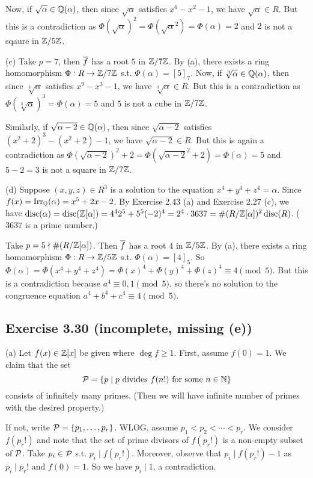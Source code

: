 \documentclass[../Marcus.tex]{subfiles}
\begin{document}
Now, if $\sqrt{\alpha}\in\mathbb{Q}(\alpha)$, then since $\sqrt{\alpha}$ satisfies $x^6-x^2-1$, we have $\sqrt{\alpha}\in R$. But this is a contradiction as $\Phi(\sqrt{\alpha})^2=\Phi(\sqrt{\alpha}^2)=\Phi(\alpha)=2$ and $2$ is not a sqaure in $\mathbb{Z}/5\mathbb{Z}$.

(c) Take $p=7$, then $\overline{f}$ has a root $5$ in $\mathbb{Z}/7\mathbb{Z}$. By (a), there exists a ring homomorphism $\Phi:R\to\mathbb{Z}/7\mathbb{Z}$ s.t. $\Phi(\alpha)=[5]_7$. Now, if $\sqrt[3]{\alpha}\in\mathbb{Q}(\alpha)$, then since $\sqrt[3]{\alpha}$ satisfies $x^9-x^3-1$, we have $\sqrt[3]{\alpha}\in R$. But this is a contradiction as $\Phi(\sqrt[3]{\alpha})^3=\Phi(\alpha)=5$ and $5$ is not a cube in $\mathbb{Z}/7\mathbb{Z}$.

Similarly, if $\sqrt{\alpha-2}\in\mathbb{Q}(\alpha)$, then since $\sqrt{\alpha-2}$ satisfies $(x^2+2)^3-(x^2+2)-1$, we have $\sqrt{\alpha-2}\in R$. But this is again a contradiction as $\Phi(\sqrt{\alpha-2})^2+2=\Phi(\sqrt{\alpha-2}^2+2)=\Phi(\alpha)=5$ and $5-2=3$ is not a square in $\mathbb{Z}/7\mathbb{Z}$.

(d) Suppose $(x,y,z)\in R^3$ is a solution to the equation $x^4+y^4+z^4=\alpha$. Since $f(x)=\operatorname{Irr}_{\mathbb{Q}}(\alpha)=x^5+2x-2$. By Exercise 2.43 (a) and Exercise 2.27 (c), we have $\operatorname{disc}(\alpha)=\operatorname{disc}(\mathbb{Z}[\alpha])=4^42^5+5^5(-2)^4=2^4\cdot 3637=\#(R/\mathbb{Z}[\alpha])^2\operatorname{disc}(R)$. ($3637$ is a prime number.)

Take $p=5\nmid \#(R/\mathbb{Z}[\alpha])$. Then $\overline{f}$ has a root $4$ in $\mathbb{Z}/5\mathbb{Z}$. By (a), there exists a ring homomorphism $\Phi:R\to\mathbb{Z}/5\mathbb{Z}$ s.t. $\Phi(\alpha)=[4]_5$. So $\Phi(\alpha)=\Phi(x^4+y^4+z^4)=\Phi(x)^4+\Phi(y)^4+\Phi(z)^4\equiv 4\pmod{5}$. But this is a contradiction because $a^4\equiv 0,1 \pmod{5}$, so there's no solution to the congruence equation $a^4+b^4+c^4\equiv 4\pmod{5}$.

\subsection*{Exercise 3.30 \color{red}(incomplete, missing (e))}

(a) Let $f(x)\in\mathbb{Z}[x]$ be given where $\deg f\geq1$. First, assume $f(0)=1$. We claim that the set
$$
\mathcal{P}=\{ p \mid p \text{ divides } f(n!) \text{ for some } n\in\mathbb{N}\}
$$
consists of infinitely many primes. (Then we will have infinite number of primes with the desired property.)

If not, write $\mathcal{P}=\{p_1,\ldots,p_r\}$. WLOG, assume $p_1<p_2<\cdots<p_r$. We consider $f(p_r!)$ and note that the set of prime divisors of $f(p_r!)$ is a non-empty subset of $\mathcal{P}$. Take $p_i\in\mathcal{P}$ s.t. $p_i\mid f(p_r!)$. Moreover, observe that $p_i\mid f(p_r!)-1$ as $p_i \mid p_r!$ and $f(0)=1$. So we have $p_i\mid 1$, a contradiction.
\end{document}
